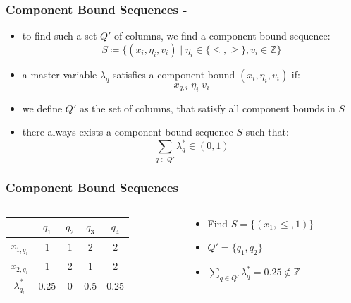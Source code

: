 \documentclass[compress,beamer,aspectratio=169,english,usenames,dvipsnames]{beamer}
\begin{document}
\begin{frame}
\frametitle{Component Bound Sequences - \cite{vanderbeck1996exact}}
\begin{itemize}
\item	to find such a set $Q'$ of columns, we find a component bound sequence:
		\begin{equation*}
		S \coloneqq \{ \left( x_i, \eta_i, v_i \right) \mid \eta_i \in \{\leq, \geq\}, v_i \in \mathbb{Z} \}
		\end{equation*}
\pause
\item	a master variable $\lambda_q$ satisfies a component bound $\left( x_i, \eta_i, v_i \right)$ if:
		\begin{equation*}
		x_{q,i} \; \eta_i \; v_i
		\end{equation*}
\item	we define $Q'$ as the set of columns, that satisfy all component bounds in $S$
\item	there always exists a component bound sequence $S$ such that:
		\begin{equation*}
		\sum_{q \in Q'} \lambda_q^* \in \left(0, 1\right)
		\end{equation*}
\end{itemize}
\end{frame}

\begin{frame}
\frametitle{Component Bound Sequences}
\begin{columns}
\begin{column}{0.5\textwidth}
\begin{tabular}{c||c|c|c|c}
 & $q_1$ & $q_2$ & $q_3$ & $q_4$ \\
\hline\hline
$x_{1,q_i}$ & 1 & 1 & 2 & 2 \\
$x_{2,q_i}$ & 1 & 2 & 1 & 2 \\
\hline\hline
$\lambda^*_{q_i}$ & 0.25 & 0 & 0.5 & 0.25 \\
\end{tabular}
\end{column}
\begin{column}{0.5\textwidth}
\pause
\begin{itemize}
\item	Find $S = \{ \left( x_1, \leq, 1 \right) \}$
\item	$Q' = \{ q_1, q_2 \}$
\item 	$\sum_{q \in Q'} \lambda_q^* = 0.25 \not\in \mathbb{Z}$
\end{itemize}
\end{column}
\end{columns}
\end{frame}
\end{document}
